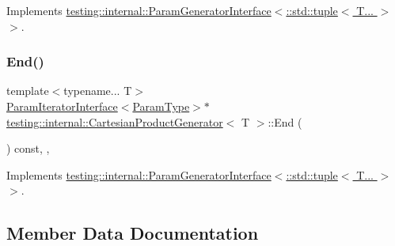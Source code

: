 Implements \hyperlink{classtesting_1_1internal_1_1ParamGeneratorInterface_ae1de83b16fe9a53c67778a026c6a9569}{testing\+::internal\+::\+Param\+Generator\+Interface$<$\+::std\+::tuple$<$ T... $>$ $>$}.

\mbox{\label{classtesting_1_1internal_1_1CartesianProductGenerator_ae072dcf8400ac9dd5692e417262a664b}} 
\subsubsection{\texorpdfstring{End()}{End()}}
{\footnotesize\ttfamily template$<$typename... T$>$ \\
\hyperlink{classtesting_1_1internal_1_1ParamIteratorInterface}{Param\+Iterator\+Interface}$<$\hyperlink{classtesting_1_1internal_1_1CartesianProductGenerator_af27131157a9347f0c82420ca081ee7dd}{Param\+Type}$>$$\ast$ \hyperlink{classtesting_1_1internal_1_1CartesianProductGenerator}{testing\+::internal\+::\+Cartesian\+Product\+Generator}$<$ T $>$\+::End (\begin{DoxyParamCaption}{ }\end{DoxyParamCaption}) const\hspace{0.3cm}{\ttfamily [inline]}, {\ttfamily [override]}, {\ttfamily [virtual]}}



Implements \hyperlink{classtesting_1_1internal_1_1ParamGeneratorInterface_afa7211b74990e11d3fc7ad4e7113da4f}{testing\+::internal\+::\+Param\+Generator\+Interface$<$\+::std\+::tuple$<$ T... $>$ $>$}.



\subsection{Member Data Documentation}
\mbox{\label{classtesting_1_1internal_1_1CartesianProductGenerator_adb1f110ba803c09b0b1c38b7602652b1}} 
